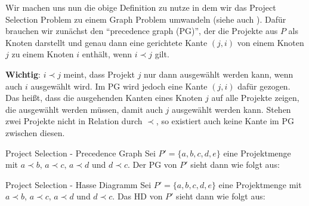 \documentclass{panikzettel}
\newcommand{\boxspace}{	\vspace{-\baselineskip}	}
\begin{document}
Wir machen uns nun die obige Definition zu nutze in dem wir das Project Selection Problem zu einem Graph Problem umwandeln (siehe auch ). Dafür brauchen wir zunächst den ``precedence graph (PG)'', der die Projekte aus $P$ als Knoten darstellt und genau dann eine gerichtete Kante $(j,i)$ von einem Knoten $j$ zu einem Knoten $i$ enthält, wenn $ i \prec j$ gilt.

\textbf{Wichtig}: $i \prec j$ meint, dass Projekt $j$ nur dann ausgewählt werden kann, wenn auch $i$ ausgewählt wird. Im PG wird jedoch eine Kante $(j,i)$ dafür gezogen. Das heißt, dass die ausgehenden Kanten eines Knoten $j$ auf alle Projekte zeigen, die ausgewählt werden müssen, damit auch $j$ ausgewählt werden kann. Stehen zwei Projekte nicht in Relation durch $\prec$, so existiert auch keine Kante im PG zwischen diesen. 

\begin{halfboxl}
	\boxspace
\begin{bsp}{Project Selection - Precedence Graph}
	Sei $P' = \{a,b,c,d,e\}$ eine Projektmenge mit $a \prec b,\, a \prec c,\, a \prec d$ und $ d \prec c$. Der PG von $P'$ sieht dann wie folgt aus:
	
	\begin{center}
	\end{center}
	
\end{bsp}
\end{halfboxl}%
\begin{halfboxr}
	\boxspace
	\begin{bsp}{Project Selection - Hasse Diagramm}
		Sei $P' = \{a,b,c,d,e\}$ eine Projektmenge mit $a \prec b,\, a \prec c,\, a \prec d$ und $ d \prec c$. Das HD von $P'$ sieht dann wie folgt aus:
		
		\begin{center}
		\end{center}
		
	\end{bsp}
	
\end{halfboxr}
\end{document}
